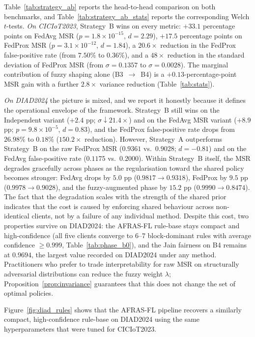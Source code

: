 \documentclass[journal]{IEEEtran}
\begin{document}
Table~\ref{tab:strategy_ab} reports the head-to-head comparison on both
benchmarks, and Table~\ref{tab:strategy_ab_stats} reports the
corresponding Welch $t$-tests. \emph{On CICIoT2023}, Strategy~B wins on
every metric: $+33.1$ percentage points on FedAvg MSR
($p = 1.8 \times 10^{-15}$, $d = 2.29$), $+17.5$ percentage points on
FedProx MSR ($p = 3.1 \times 10^{-12}$, $d = 1.84$), a $20.6\times$
reduction in the FedProx false-positive rate (from $7.50\%$ to
$0.36\%$), and a $48\times$ reduction in the standard deviation of
FedProx MSR (from $\sigma = 0.1357$ to $\sigma = 0.0028$). The
marginal contribution of fuzzy shaping alone (B3~$\to$~B4) is a
$+0.13$-percentage-point MSR gain with a further $2.8\times$ variance
reduction (Table~\ref{tab:stats}).

\emph{On DIAD2024} the picture is mixed, and we report it honestly
because it defines the operational envelope of the framework.
Strategy~B still wins on the Independent variant ($+2.4$ pp;
$\sigma\!\downarrow\!21.4\times$) and on the FedAvg MSR variant
($+8.9$ pp; $p = 9.8\times 10^{-5}$, $d = 0.83$), and the FedProx
false-positive rate drops from $26.98\%$ to $0.18\%$ ($150.2\times$
reduction). However, Strategy~A outperforms Strategy~B on the raw
FedProx MSR ($0.9361$ vs.\ $0.9028$; $d = -0.81$) and on the FedAvg
false-positive rate ($0.1175$ vs.\ $0.2000$). Within Strategy~B
itself, the MSR degrades gracefully across phases as the regularisation
toward the shared policy becomes stronger: FedAvg drops by $5.0$ pp
($0.9817 \to 0.9318$), FedProx by $9.5$ pp
($0.9978 \to 0.9028$), and the fuzzy-augmented phase by $15.2$ pp
($0.9990 \to 0.8474$). The fact that the degradation scales with the
strength of the shared prior indicates that the cost is caused by
enforcing shared behaviour across non-identical clients, not by a
failure of any individual method. Despite this cost, two properties
survive on DIAD2024: the AFRAS-FL rule-base stays compact and
high-confidence (all five clients converge to $6$--$7$ block-dominant
rules with average confidence $\ge 0.999$, Table~\ref{tab:phase_b0}),
and the Jain fairness on B4 remains at $0.9694$, the largest value
recorded on DIAD2024 under any method. Practitioners who prefer to
trade interpretability for raw MSR on structurally adversarial
distributions can reduce the fuzzy weight $\lambda$;
Proposition~\ref{prop:invariance} guarantees that this does not change
the set of optimal policies.

Figure~\ref{fig:diad_rules} shows that the AFRAS-FL pipeline recovers a
similarly compact, high-confidence rule-base on DIAD2024 using the same
hyperparameters that were tuned for CICIoT2023.
\end{document}
